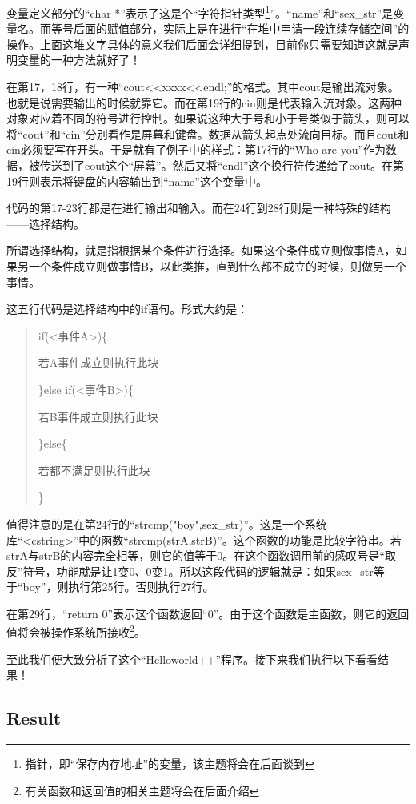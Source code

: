 变量定义部分的“char *”表示了这是个“字符指针类型\footnote{指针，即“保存内存地址”的变量，该主题将会在后面谈到}”。“name”和“sex\_str”是变量名。而等号后面的赋值部分，实际上是在进行“在堆中申请一段连续存储空间”的操作。上面这堆文字具体的意义我们后面会详细提到，目前你只需要知道这就是声明变量的一种方法就好了！

在第17，18行，有一种“cout<<xxxx<<endl;”的格式。其中cout是输出流对象。也就是说需要输出的时候就靠它。而在第19行的cin则是代表输入流对象。这两种对象对应着不同的符号进行控制。如果说这种大于号和小于号类似于箭头，则可以将“cout”和“cin”分别看作是屏幕和键盘。数据从箭头起点处流向目标。而且cout和cin必须要写在开头。于是就有了例子中的样式：第17行的“Who are you”作为数据，被传送到了cout这个“屏幕”。然后又将“endl”这个换行符传递给了cout。在第19行则表示将键盘的内容输出到“name”这个变量中。

代码的第17-23行都是在进行输出和输入。而在24行到28行则是一种特殊的结构——选择结构。

所谓选择结构，就是指根据某个条件进行选择。如果这个条件成立则做事情A，如果另一个条件成立则做事情B，以此类推，直到什么都不成立的时候，则做另一个事情。

这五行代码是选择结构中的if语句。形式大约是：
\begin{quote}
if(<事件A>)\{

	\qquad 若A事件成立则执行此块
	
\}else if(<事件B>)\{

	\qquad 若B事件成立则执行此块
	
\}else\{

	\qquad 若都不满足则执行此块
	
\}
\end{quote}

值得注意的是在第24行的“strcmp("boy",sex\_str)”。这是一个系统库“<cstring>”中的函数“strcmp(strA,strB)”。这个函数的功能是比较字符串。若strA与strB的内容完全相等，则它的值等于0。在这个函数调用前的感叹号是“取反”符号，功能就是让1变0、0变1。所以这段代码的逻辑就是：如果sex\_str等于“boy”，则执行第25行。否则执行27行。

在第29行，“return 0”表示这个函数返回“0”。由于这个函数是主函数，则它的返回值将会被操作系统所接收\footnote{有关函数和返回值的相关主题将会在后面介绍}。

至此我们便大致分析了这个“Helloworld++”程序。接下来我们执行以下看看结果！

\subsection{Result}

